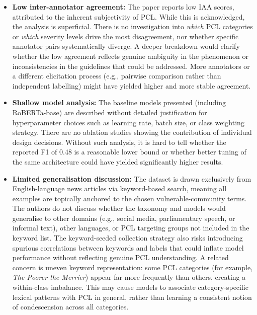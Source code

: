 \documentclass[11pt]{article}
\begin{document}
\begin{itemize}
    \item \textbf{Low inter-annotator agreement:} The paper reports low IAA scores, attributed to the inherent subjectivity of PCL. While this is acknowledged, the analysis is superficial. There is no investigation into \emph{which} PCL categories or \emph{which} severity levels drive the most disagreement, nor whether specific annotator pairs systematically diverge. A deeper breakdown would clarify whether the low agreement reflects genuine ambiguity in the phenomenon or inconsistencies in the guidelines that could be addressed. More annotators or a different elicitation process (e.g., pairwise comparison rather than independent labelling) might have yielded higher and more stable agreement.

    \item \textbf{Shallow model analysis:} The baseline models presented (including RoBERTa-base) are described without detailed justification for hyperparameter choices such as learning rate, batch size, or class weighting strategy. There are no ablation studies showing the contribution of individual design decisions. Without such analysis, it is hard to tell whether the reported F1 of 0.48 is a reasonable lower bound or whether better tuning of the same architecture could have yielded significantly higher results.

    \item \textbf{Limited generalisation discussion:} The dataset is drawn exclusively from English-language news articles via keyword-based search, meaning all examples are topically anchored to the chosen vulnerable-community terms. The authors do not discuss whether the taxonomy and models would generalise to other domains (e.g., social media, parliamentary speech, or informal text), other languages, or PCL targeting groups not included in the keyword list. The keyword-seeded collection strategy also risks introducing spurious correlations between keywords and labels that could inflate model performance without reflecting genuine PCL understanding. A related concern is uneven keyword representation: some PCL categories (for example, \textit{The Poorer the Merrier}) appear far more frequently than others, creating a within-class imbalance. This may cause models to associate category-specific lexical patterns with PCL in general, rather than learning a consistent notion of condescension across all categories.
\end{itemize}
\end{document}
